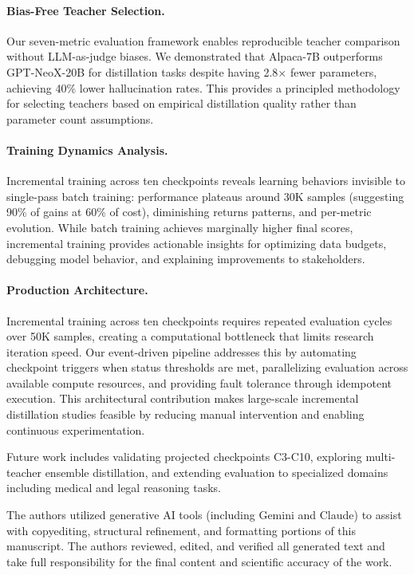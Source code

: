 \documentclass[sigconf]{acmart}
\begin{document}
\paragraph{Bias-Free Teacher Selection.}
Our seven-metric evaluation framework enables reproducible teacher comparison without LLM-as-judge biases. We demonstrated that Alpaca-7B outperforms GPT-NeoX-20B for distillation tasks despite having 2.8× fewer parameters, achieving 40\% lower hallucination rates. This provides a principled methodology for selecting teachers based on empirical distillation quality rather than parameter count assumptions.

\paragraph{Training Dynamics Analysis.}
Incremental training across ten checkpoints reveals learning behaviors invisible to single-pass batch training: performance plateaus around 30K samples (suggesting 90\% of gains at 60\% of cost), diminishing returns patterns, and per-metric evolution. While batch training achieves marginally higher final scores, incremental training provides actionable insights for optimizing data budgets, debugging model behavior, and explaining improvements to stakeholders.

\paragraph{Production Architecture.}
Incremental training across ten checkpoints requires repeated evaluation cycles over 50K samples, creating a computational bottleneck that limits research iteration speed. Our event-driven pipeline addresses this by automating checkpoint triggers when status thresholds are met, parallelizing evaluation across available compute resources, and providing fault tolerance through idempotent execution. This architectural contribution makes large-scale incremental distillation studies feasible by reducing manual intervention and enabling continuous experimentation.

Future work includes validating projected checkpoints C3-C10, exploring multi-teacher ensemble distillation, and extending evaluation to specialized domains including medical and legal reasoning tasks.

\begin{acks}
The authors utilized generative AI tools (including Gemini and Claude) to assist with copyediting, structural refinement, and formatting portions of this manuscript. The authors reviewed, edited, and verified all generated text and take full responsibility for the final content and scientific accuracy of the work.
\end{acks}
\end{document}
